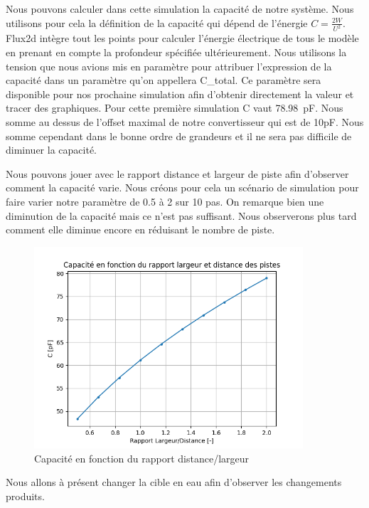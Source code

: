 Nous pouvons calculer dans cette simulation la capacité de notre système. Nous utilisons pour cela la définition de la capacité qui dépend de l'énergie $C = \frac{2W}{U^2}$. Flux2d intègre tout les points pour calculer l'énergie électrique de tous le modèle en prenant en compte la profondeur spécifiée ultérieurement. Nous utilisons la tension que nous avions mis en paramètre pour attribuer l’expression de la capacité dans un paramètre qu'on appellera C\_total. Ce paramètre sera disponible pour nos prochaine simulation afin d'obtenir directement la valeur et tracer des graphiques. Pour cette première simulation C vaut \SI{78.98}{\pico\farad}. Nous somme au dessus de l'offset maximal de notre convertisseur qui est de 10pF. Nous somme cependant dans le bonne ordre de grandeurs et il ne sera pas difficile de diminuer la capacité. 

Nous pouvons jouer avec le rapport distance et largeur de piste afin d'observer comment la capacité varie. Nous créons pour cela un scénario de simulation pour faire varier notre paramètre de 0.5 à 2 sur 10 pas. On remarque bien une diminution de la capacité mais ce n'est pas suffisant. Nous observerons plus tard comment elle diminue encore en réduisant le nombre de piste.

\newpage

\begin{figure}[!ht]
 \centering
 \includegraphics[width=10cm]{C20airGraph.png}
 \caption{Capacité en fonction du rapport distance/largeur}
\end{figure}

Nous allons à présent changer la cible en eau afin d'observer les changements produits.


